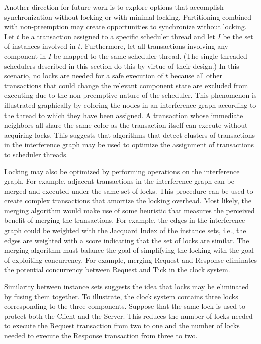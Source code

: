 Another direction for future work is to explore options that accomplish synchronization without locking or with minimal locking.
Partitioning combined with non-preemption may create opportunities to synchronize without locking.
Let $t$ be a transaction assigned to a specific scheduler thread and let $I$ be the set of instances involved in $t$.
Furthermore, let all transactions involving any component in $I$ be mapped to the same scheduler thread.
(The single-threaded schedulers described in this section do this by virtue of their design.)
In this scenario, no locks are needed for a safe execution of $t$ because all other transactions that could change the relevant component state are excluded from executing due to the non-preemptive nature of the scheduler.
This phenomenon is illustrated graphically by coloring the nodes in an interference graph according to the thread to which they have been assigned.
A transaction whose immediate neighbors all share the same color as the transaction itself can execute without acquiring locks.
This suggests that algorithms that detect clusters of transactions in the interference graph may be used to optimize the assignment of transactions to scheduler threads.

Locking may also be optimized by performing operations on the interference graph.
For example, adjacent transactions in the interference graph can be merged and executed under the same set of locks.
This procedure can be used to create complex transactions that amortize the locking overhead.
Most likely, the merging algorithm would make use of some heuristic that measures the perceived benefit of merging the transactions.
For example, the edges in the interference graph could be weighted with the Jacquard Index of the instance sets, i.e., the edges are weighted with a score indicating that the set of locks are similar.
The merging algorithm must balance the goal of simplifying the locking with the goal of exploiting concurrency.
For example, merging Request and Response eliminates the potential concurrency between Request and Tick in the clock system.

Similarity between instance sets suggests the idea that locks may be eliminated by fusing them together.
To illustrate, the clock system contains three locks corresponding to the three components.
Suppose that the same lock is used to protect both the Client and the Server.
This reduces the number of locks needed to execute the Request transaction from two to one and the number of locks needed to execute the Response transaction from three to two.

